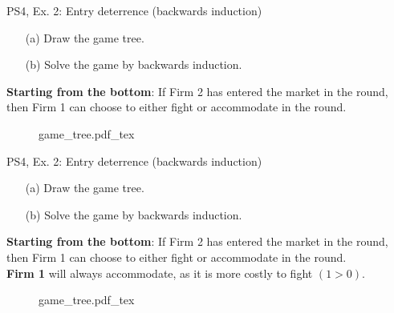 \begin{frame}{PS4, Ex. 2: Entry deterrence (backwards induction)}
  \begin{multicols}{2}
    \begin{itemize}
      \item[(a)] Draw the game tree.
      \item[(b)] Solve the game by backwards induction.
    \end{itemize}
    \textbf{Starting from the bottom}: If Firm 2 has entered the market in the  round, then Firm 1 can choose to either fight or accommodate in the  round.
  \vfill\null \columnbreak
    \begin{figure}[!h]
      \begin{center}
      \def\svgwidth{1.0\columnwidth}
      {game_tree.pdf_tex}
      \end{center}
    \end{figure}
  \vfill\null
  \end{multicols}
\end{frame}
\begin{frame}{PS4, Ex. 2: Entry deterrence (backwards induction)}
  \begin{multicols}{2}
    \begin{itemize}
      \item[(a)] Draw the game tree.
      \item[(b)] Solve the game by backwards induction.
    \end{itemize}
    \textbf{Starting from the bottom}: If Firm 2 has entered the market in the  round, then Firm 1 can choose to either fight or accommodate in the  round.\\\medskip
    \textbf{Firm 1} will always accommodate, as it is more costly to fight $(1>0)$.
  \vfill\null \columnbreak
    \begin{figure}[!h]
      \begin{center}
      \def\svgwidth{1.0\columnwidth}
      {game_tree.pdf_tex}
      \end{center}
    \end{figure}
  \vfill\null
  \end{multicols}
\end{frame}
